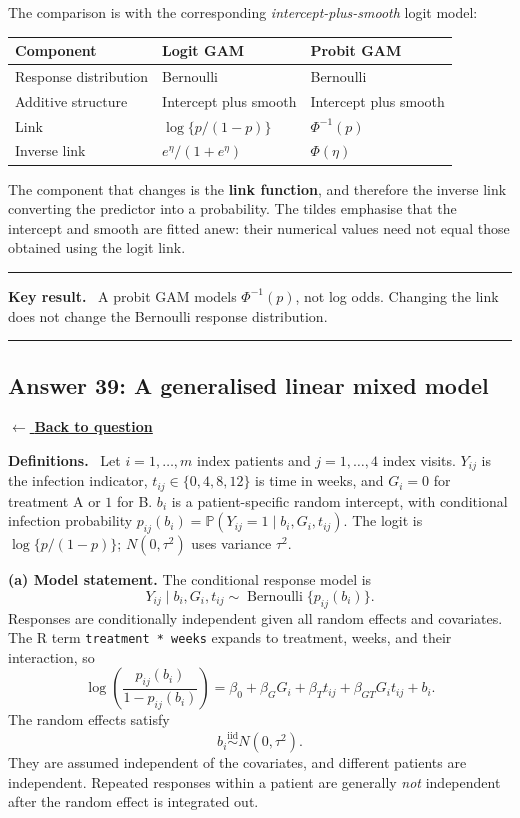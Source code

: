 \documentclass[11pt,a4paper]{article}
\newcommand{\given}{\mathrel{|}}
\newcommand{\answernav}[1]{%
  \label{answer:#1}%
  \noindent\hyperref[question:#1]{$\leftarrow$ \textbf{Back to question}}%
  \par\smallskip}
\newcommand{\studyheading}[1]{%
  \par\medskip\noindent\textcolor{statblue}{\textbf{#1.}}\ }
\newenvironment{keyresult}
  {\begin{center}\begin{minipage}{0.92\linewidth}\color{statblue}%
   \hrule\vspace{6pt}\textbf{Key result.}\ }
  {\vspace{6pt}\hrule\end{minipage}\end{center}}
\begin{document}
The comparison is with the corresponding \emph{intercept-plus-smooth}
logit model:
\begin{center}
\renewcommand{\arraystretch}{1.35}
\begin{tabular}{lll}
\hline
Component & Logit GAM & Probit GAM\\
\hline
Response distribution & Bernoulli & Bernoulli\\
Additive structure & Intercept plus smooth & Intercept plus smooth\\
Link & $\log\{p/(1-p)\}$ & $\Phi^{-1}(p)$\\
Inverse link & $e^\eta/(1+e^\eta)$ & $\Phi(\eta)$\\
\hline
\end{tabular}
\end{center}
The component that changes is the \textbf{link function}, and therefore
the inverse link converting the predictor into a probability. The tildes
emphasise that the intercept and smooth are fitted anew: their numerical
values need not equal those obtained using the logit link.

\begin{keyresult}
A probit GAM models $\Phi^{-1}(p)$, not log odds. Changing the link does
not change the Bernoulli response distribution.
\end{keyresult}

\clearpage

\subsection{Answer 39: A generalised linear mixed model}
\answernav{39}

\studyheading{Definitions}
Let $i=1,\ldots,m$ index patients and $j=1,\ldots,4$ index visits.
$Y_{ij}$ is the infection indicator, $t_{ij}\in\{0,4,8,12\}$ is time in weeks, and $G_i=0$ for treatment A or $1$ for B.
$b_i$ is a patient-specific random intercept, with conditional infection probability
$p_{ij}(b_i)=\mathbb P(Y_{ij}=1\given b_i,G_i,t_{ij})$.
The logit is $\log\{p/(1-p)\}$; $N(0,\tau^2)$ uses variance $\tau^2$.

\textbf{(a) Model statement.}
The conditional response model is
\[
Y_{ij}\given b_i,G_i,t_{ij}
\sim\operatorname{Bernoulli}\{p_{ij}(b_i)\}.
\]
Responses are conditionally independent given all random effects and
covariates. The R term \texttt{treatment * weeks} expands to treatment,
weeks, and their interaction, so
\[
\boxed{
\log\left(\frac{p_{ij}(b_i)}{1-p_{ij}(b_i)}\right)
=\beta_0+\beta_GG_i+\beta_Tt_{ij}
+\beta_{GT}G_it_{ij}+b_i.
}
\]
The random effects satisfy
\[
\boxed{b_i\overset{\mathrm{iid}}{\sim}N(0,\tau^2).}
\]
They are assumed independent of the covariates, and different patients
are independent. Repeated responses within a patient are generally
\emph{not} independent after the random effect is integrated out.
\end{document}
